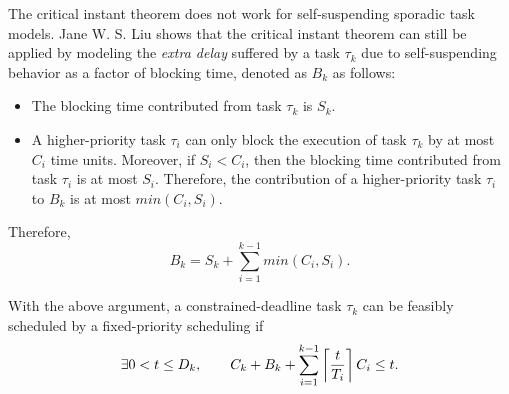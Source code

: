 The critical instant theorem does not work for self-suspending sporadic task models.  
Jane W. S. Liu \cite{Liu:2000:RS:518501} shows that the critical instant theorem can still be applied by modeling the \emph{extra delay} suffered by a task $\tau_k$ due to self-suspending behavior as a factor of blocking time, denoted as $B_k$ as follows:
\begin{itemize}
\item The blocking time contributed from task $\tau_k$ is $S_k$.
\item A higher-priority task $\tau_i$ can only block the execution of task $\tau_k$ by at most $C_i$ time units. Moreover, if $S_i < C_i$, then the blocking time contributed from task $\tau_i$ is at most $S_i$. Therefore, the contribution of a higher-priority task $\tau_i$  to $B_k$ is at most $min(C_i, S_i)$.
\end{itemize}
Therefore, 
\begin{equation}
\label{eq:Bk}
B_k = S_k + \sum_{i=1}^{k-1} min(C_i, S_i).
\end{equation}

With the above argument, a constrained-deadline task $\tau_k$ can be feasibly scheduled by a fixed-priority scheduling if
\begin{equation}
\label{eq:TDA-suspension}
\exists 0 < t \leq D_k, \qquad C_k + B_k + \sum_{i=1}^{k-1}\left\lceil{\frac{t}{T_i}}\right\rceil C_i \leq t.
\end{equation}
  
  
  
  
  
  
  
  
  
  
  
  
  
  
